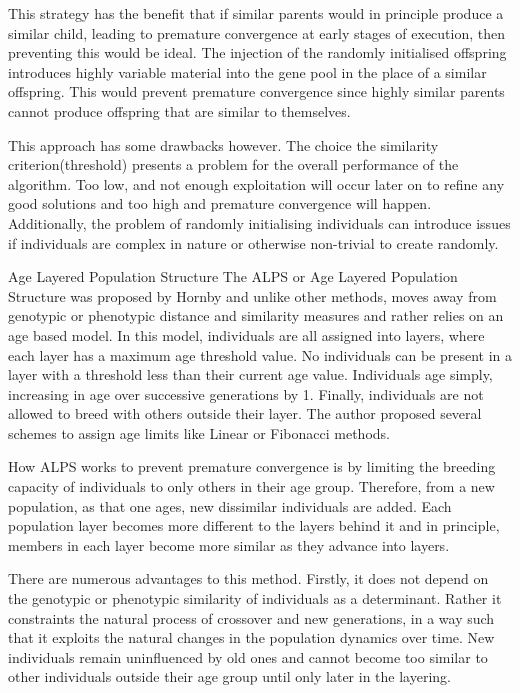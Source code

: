 \documentclass[12pt]{article}
\begin{document}
This strategy has the benefit that if similar parents would in principle produce a similar child, leading to premature convergence at early stages of execution, then preventing this would be ideal. The injection of the randomly initialised offspring introduces highly variable material into the gene pool in the place of a similar offspring. This would prevent premature convergence since highly similar parents cannot produce offspring that are similar to themselves.

This approach has some drawbacks however. The choice the similarity criterion(threshold) presents a problem for the overall performance of the algorithm. Too low, and not enough exploitation will occur later on to refine any good solutions and too high and premature convergence will happen. Additionally, the problem of randomly initialising individuals can introduce issues if individuals are complex in nature or otherwise non-trivial to create randomly.

Age Layered Population Structure
The ALPS or Age Layered Population Structure was proposed by Hornby \cite{Hornby} and unlike other methods, moves away from genotypic or phenotypic distance and similarity measures and rather relies on an age based model. In this model, individuals are all assigned into layers, where each layer has a maximum age threshold value. No individuals can be present in a layer with a threshold less than their current age value. Individuals age simply, increasing in age over successive	generations by 1. Finally, individuals are not allowed to breed with others outside their layer. The author proposed several schemes to assign age limits like Linear or Fibonacci methods. 

How ALPS works to prevent premature convergence is by limiting the breeding capacity of individuals to only others in their age group. Therefore, from a new population, as that one ages, new dissimilar individuals are added. Each population layer becomes more different to the layers behind it and in principle, members in each layer become more similar as they advance into layers.

There are numerous advantages to this method. Firstly, it does not depend on the genotypic or phenotypic similarity	of individuals as a determinant. Rather it constraints the natural process of crossover and new generations, in a way such that it exploits the natural changes in the population dynamics over time. New individuals remain uninfluenced by old ones and cannot become too similar to other individuals outside their age group until only later in the layering.
\end{document}
